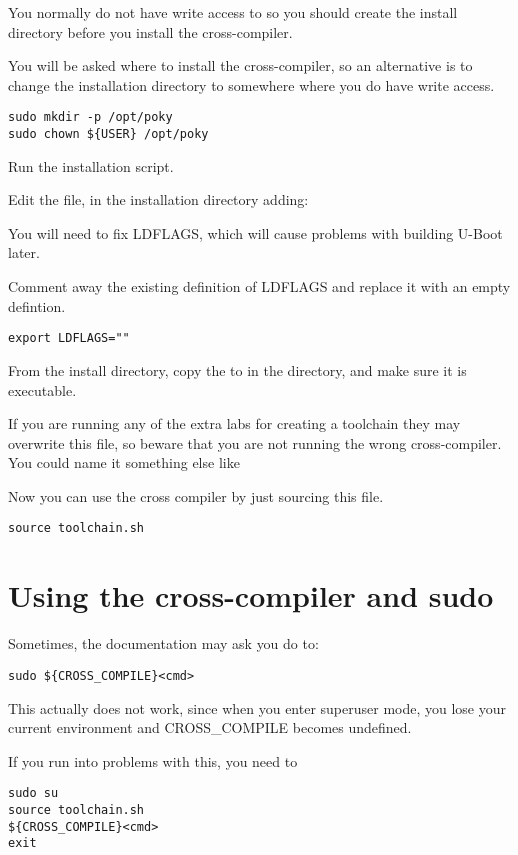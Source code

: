 You normally do not have write access to  so you should
create the install directory before you install the cross-compiler.

You will be asked where to install the cross-compiler, so an alternative 
is to change the installation directory to somewhere where you do have write access.

\begin{verbatim}
sudo mkdir -p /opt/poky
sudo chown ${USER} /opt/poky
\end{verbatim}

Run the installation script.

Edit the  file, 
in the installation directory adding:

You will need to fix LDFLAGS, which will cause problems with building U-Boot later.

Comment away the existing definition of LDFLAGS and replace it with an empty defintion.

\begin{verbatim}
export LDFLAGS=""
\end{verbatim}

From the install directory, copy the 
 to
 in the \labdir directory, and make sure it is executable.

If you are running any of the extra labs for creating a toolchain
they may overwrite this file, so beware that you are not running
the wrong cross-compiler. You could name it something else like

Now you can use the cross compiler by just sourcing this file.

\begin{verbatim}
source toolchain.sh
\end{verbatim}

\section{Using the cross-compiler and sudo}

Sometimes, the documentation may ask you do to:

\begin{verbatim}
sudo ${CROSS_COMPILE}<cmd>
\end{verbatim}

This actually does not work, since when you enter superuser mode, you
lose your current environment and CROSS\_COMPILE becomes undefined.

If you run into problems with this, you need to
\begin{verbatim}
sudo su
source toolchain.sh
${CROSS_COMPILE}<cmd>
exit
\end{verbatim}


